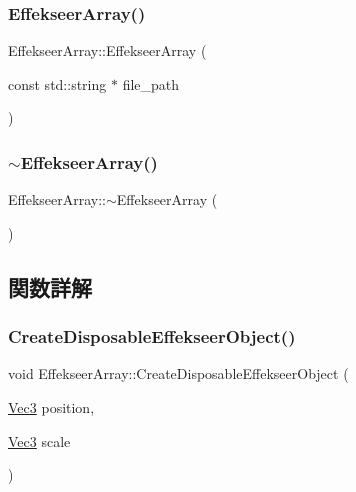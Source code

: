 \subsubsection{\texorpdfstring{Effekseer\+Array()}{EffekseerArray()}}
{\footnotesize\ttfamily Effekseer\+Array\+::\+Effekseer\+Array (\begin{DoxyParamCaption}\item[{const std\+::string $\ast$}]{file\+\_\+path }\end{DoxyParamCaption})}

\mbox{\label{class_effekseer_array_af5e7c360c77737f0c46b3a9dad2725ac}} 
\subsubsection{\texorpdfstring{$\sim$\+Effekseer\+Array()}{~EffekseerArray()}}
{\footnotesize\ttfamily Effekseer\+Array\+::$\sim$\+Effekseer\+Array (\begin{DoxyParamCaption}{ }\end{DoxyParamCaption})}



\subsection{関数詳解}
\mbox{\label{class_effekseer_array_a8c86aa79851ef86f253c13765f708383}} 
\subsubsection{\texorpdfstring{Create\+Disposable\+Effekseer\+Object()}{CreateDisposableEffekseerObject()}}
{\footnotesize\ttfamily void Effekseer\+Array\+::\+Create\+Disposable\+Effekseer\+Object (\begin{DoxyParamCaption}\item[{\mbox{\hyperlink{_vector3_d_8h_ab16f59e4393f29a01ec8b9bbbabbe65d}{Vec3}}}]{position,  }\item[{\mbox{\hyperlink{_vector3_d_8h_ab16f59e4393f29a01ec8b9bbbabbe65d}{Vec3}}}]{scale }\end{DoxyParamCaption})}

